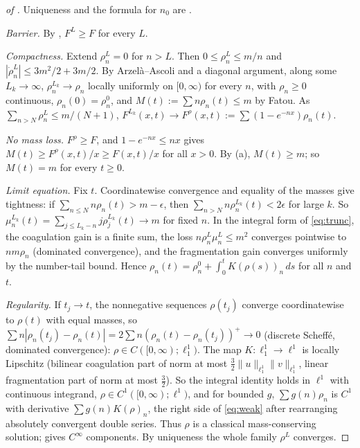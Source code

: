 \documentclass[11pt,a4paper]{report}
\begin{document}
\begin{proof}[of ]
Uniqueness and the formula for \(n_0\) are .

\emph{Barrier.} By , \(F^L\ge F\) for every \(L\).

\emph{Compactness.} Extend \(\rho^L_n=0\) for \(n>L\). Then \(0\le\rho^L_n\le m/n\) and
\(|\dot\rho^L_n|\le3m^2/2+3m/2\). By Arzelà--Ascoli and a diagonal argument, along some \(L_k\to\infty\),
\(\rho^{L_k}_n\to\rho_n\) locally uniformly on \([0,\infty)\) for every \(n\), with \(\rho_n\ge0\) continuous,
\(\rho_n(0)=\rho^0_n\), and \(M(t):=\sum n\rho_n(t)\le m\) by Fatou. As \(\sum_{n>N}\rho^L_n\le m/(N+1)\),
\(F^{L_k}(x,t)\to F^\rho(x,t):=\sum(1-e^{-nx})\rho_n(t)\).

\emph{No mass loss.} \(F^\rho\ge F\), and \(1-e^{-nx}\le nx\) gives
\(M(t)\ge F^\rho(x,t)/x\ge F(x,t)/x\) for all \(x>0\). By (a), \(M(t)\ge m\); so \(M(t)=m\)
for every \(t\ge0\).

\emph{Limit equation.} Fix \(t\). Coordinatewise convergence and equality of the masses give tightness: if
\(\sum_{n\le N}n\rho_n(t)>m-\epsilon\), then \(\sum_{n>N}n\rho^{L_k}_n(t)<2\epsilon\) for large \(k\). So
\(\mu^{L_k}_n(t)=\sum_{j\le L_k-n}j\rho^{L_k}_j(t)\to m\) for fixed \(n\). In the integral form of
\eqref{eq:trunc}, the coagulation gain is a finite sum, the loss \(n\rho^L_n\mu^L_n\le m^2\) converges
pointwise to \(nm\rho_n\) (dominated convergence), and the fragmentation gain converges uniformly by the
number-tail bound. Hence \(\rho_n(t)=\rho^0_n+\int_0^tK(\rho(s))_n\,ds\) for all \(n\) and \(t\).

\emph{Regularity.} If \(t_j\to t\), the nonnegative sequences \(\rho(t_j)\) converge coordinatewise to
\(\rho(t)\) with equal masses, so \(\sum n|\rho_n(t_j)-\rho_n(t)|=2\sum n(\rho_n(t)-\rho_n(t_j))^+\to0\)
(discrete Scheffé, dominated convergence): \(\rho\in C([0,\infty);\ell^1_1)\). The map
\(K:\ell^1_1\to\ell^1\) is locally Lipschitz (bilinear coagulation part of norm at most
\(\frac32\|u\|_{\ell^1_1}\|v\|_{\ell^1_1}\), linear fragmentation part of norm at most \(\frac32\)). So the integral
identity holds in \(\ell^1\) with continuous integrand, \(\rho\in C^1([0,\infty);\ell^1)\), and for bounded
\(g\), \(\sum g(n)\rho_n\) is \(C^1\) with derivative \(\sum g(n)K(\rho)_n\), the right side of \eqref{eq:weak}
after rearranging absolutely convergent double series. Thus \(\rho\) is a classical mass-conserving solution;
 gives \(C^\infty\) components. By uniqueness the whole family \(\rho^L\) converges.
\end{proof}
\end{document}
